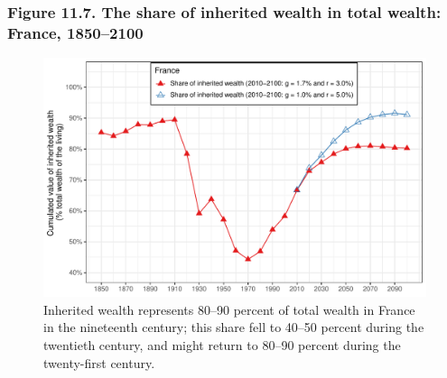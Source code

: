 \documentclass[t]{beamer}\usepackage[]{graphicx}\usepackage[]{color}
\newenvironment{knitrout}{}{} %
\begin{document}
\begin{frame}[label=Figure_11_7]
\frametitle{Figure 11.7. The share of inherited wealth in total wealth: France, 1850--2100}
\begin{figure}[t]
\begin{minipage}[b]{\textwidth}
\centering
\begin{knitrout}\footnotesize
{}\color{fgcolor}

{\centering \includegraphics[width=1\linewidth]{figures/color/Figure_11_7} 

}



\end{knitrout}
\caption{Inherited wealth represents 80--90 percent of total wealth in France in the nineteenth century; this share fell to 40--50 percent during the twentieth century, and might return to 80--90 percent during the twenty-first century.}
\end{minipage}
\end{figure}
\end{frame}
\end{document}
